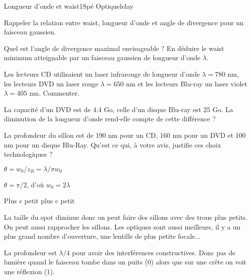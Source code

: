 \begin{exercise}{Longueur d'onde et waist}{1}{Spé}
{Optique}{lelay}

\begin{questions}
    \questioncours Rappeler la relation entre waist, longueur d'onde et angle de divergence pour un faisceau gaussien.
    
    \question Quel est l'angle de divergence maximal envisageable ? En déduire le waist minimum atteignable par un faisceau gaussien de longueur d'onde $\lambda$.
    
    \question Les lecteurs CD utilisaient un laser infrarouge de longueur d'onde $\lambda = 780$ nm, les lecteurs DVD un laser rouge $\lambda = 650$ nm et les lecteurs Blu-ray un laser violet $\lambda = 405$ nm. Commenter.
    
    \question La capacité d'un DVD est de 4.4 Go, celle d'un disque Blu-ray est 25 Go. La diminution de la longueur d'onde rend-elle compte de cette différence ? 
    
    \question La profondeur du sillon est de 190 nm pour un CD, 160 nm pour un DVD et 100 nm pour un disque Blu-Ray. Qu'est ce qui, à votre avis, justifie ces choix technologiques ?
\end{questions}

\end{exercise}

\begin{solution}

\begin{questions}
    \questioncours $\theta = w_0/z_R = \lambda/\pi w_0$
    
    \question $\theta = \pi/2$, d'où $w_0 = 2 \lambda$
    
    \question Plus c petit plus c petit
    
    \question La taille du spot diminue donc on peut faire des sillons avec des trous plus petits. On peut aussi rapprocher les sillons. Les optiques sont aussi meilleurs, il y a un plus grand nombre d'ouverture, une lentille de plus petite focale...
    
    \question La profondeur est $\lambda/4$ pour avoir des interférences constructives. Donc pas de lumière quand le faisceau tombe dans un puits (0) alors que sur une crête on voit une réflexion (1).
\end{questions}
\end{solution}